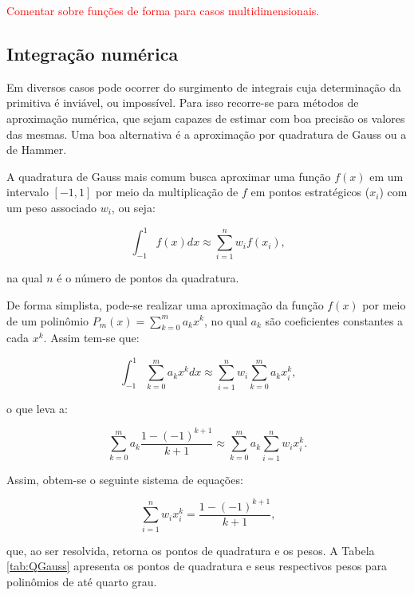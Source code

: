\textcolor{red}{Comentar sobre funções de forma para casos multidimensionais.}

\subsection{Integração numérica} \label{MEFP-IntNum}

Em diversos casos pode ocorrer do surgimento de integrais cuja determinação da primitiva é inviável, ou impossível. Para isso recorre-se para métodos de aproximação numérica, que sejam capazes de estimar com boa precisão os valores das mesmas. Uma boa alternativa é a aproximação por quadratura de Gauss ou a de Hammer.

A quadratura de Gauss mais comum busca aproximar uma função $f(x)$ em um intervalo $[-1,1]$ por meio da multiplicação de $f$ em pontos estratégicos ($x_i$) com um peso associado $w_i$, ou seja:

\begin{equation}
    \int_{-1}^1{f(x)dx}\approx\sum_{i=1}^n{w_if(x_i)}\text{,}
\end{equation}

\noindent na qual $n$ é o número de pontos da quadratura.

De forma simplista, pode-se realizar uma aproximação da função $f(x)$ por meio de um polinômio $P_m(x)=\sum_{k=0}^m{a_kx^k}$, no qual $a_k$ são coeficientes constantes a cada $x^k$. Assim tem-se que:

\begin{equation}
    \int_{-1}^1{\sum_{k=0}^m{a_kx^k}dx}\approx\sum_{i=1}^n{w_i\sum_{k=0}^m{a_kx_i^k}}\text{,}
\end{equation}

\noindent o que leva a:

\begin{equation}
    \sum_{k=0}^m{a_k\frac{1-(-1)^{k+1}}{k+1}}\approx\sum_{k=0}^m{a_k\sum_{i=1}^n{w_ix_i^k}}\text{.}
\end{equation}

Assim, obtem-se o seguinte sistema de equações:

\begin{equation}
    \sum_{i=1}^n{w_ix_i^k}=\frac{1-(-1)^{k+1}}{k+1}\text{,}
\end{equation}

\noindent que, ao ser resolvida, retorna os pontos de quadratura e os pesos. A Tabela \ref{tab:QGauss} apresenta os pontos de quadratura e seus respectivos pesos para polinômios de até quarto grau.

